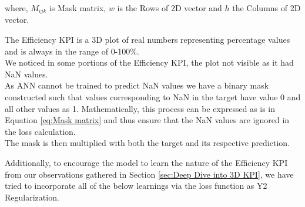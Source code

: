 \documentclass{report} %
\begin{document}
where, \(M_{ijk}\) is Mask matrix, \(w\) is the Rows of \ac{2D} vector and \(h\) the Columns of \ac{2D} vector.

The Efficiency \ac{KPI} is a \ac{3D} plot of real numbers representing percentage values and is always in the range of 0-100\%.\\
We noticed in some portions of the Efficiency \ac{KPI}, the plot not visible as it had \ac{NaN} values.\\
As ANN cannot be trained to predict \ac{NaN} values we have a binary mask constructed such that values corresponding to \ac{NaN} in the target have value 0 and all other values as 1.
Mathematically, this process can be expressed as is in Equation \ref{eq:Mask matrix} and thus ensure that the \ac{NaN} values are ignored in the loss calculation. \\ 
The mask is then multiplied with both the target and its respective prediction. 

Additionally, to encourage the model to learn the nature of the Efficiency \ac{KPI} from our observations gathered in Section \ref{sec:Deep Dive into 3D KPI}, we have tried to incorporate all of the below learnings via the loss function as Y2 Regularization.\\
\end{document}
